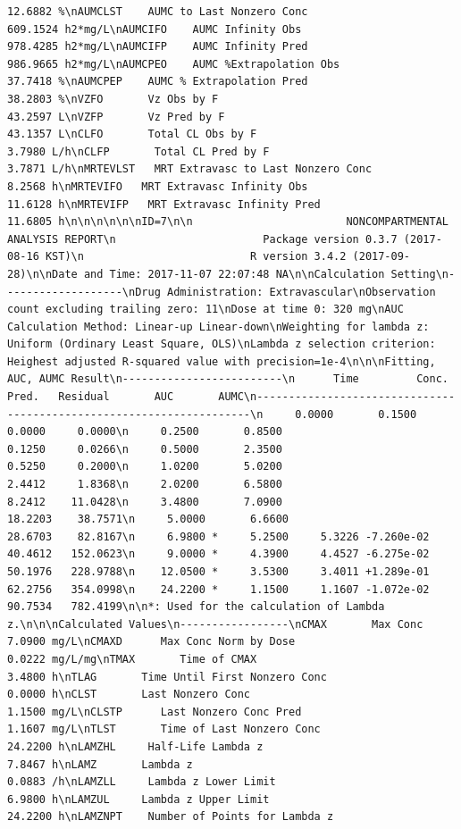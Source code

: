 \documentclass[12pt,]{krantz}
\theoremstyle{definition}
\theoremstyle{definition}
\theoremstyle{definition}
\theoremstyle{remark}
\begin{document}
\begin{verbatim}
12.6882 %\nAUMCLST    AUMC to Last Nonzero Conc                     609.1524 h2*mg/L\nAUMCIFO    AUMC Infinity Obs                             978.4285 h2*mg/L\nAUMCIFP    AUMC Infinity Pred                            986.9665 h2*mg/L\nAUMCPEO    AUMC %Extrapolation Obs                        37.7418 %\nAUMCPEP    AUMC % Extrapolation Pred                      38.2803 %\nVZFO       Vz Obs by F                                    43.2597 L\nVZFP       Vz Pred by F                                   43.1357 L\nCLFO       Total CL Obs by F                               3.7980 L/h\nCLFP       Total CL Pred by F                              3.7871 L/h\nMRTEVLST   MRT Extravasc to Last Nonzero Conc              8.2568 h\nMRTEVIFO   MRT Extravasc Infinity Obs                     11.6128 h\nMRTEVIFP   MRT Extravasc Infinity Pred                    11.6805 h\n\n\n\n\n\nID=7\n\n                        NONCOMPARTMENTAL ANALYSIS REPORT\n                       Package version 0.3.7 (2017-08-16 KST)\n                          R version 3.4.2 (2017-09-28)\n\nDate and Time: 2017-11-07 22:07:48 NA\n\nCalculation Setting\n-------------------\nDrug Administration: Extravascular\nObservation count excluding trailing zero: 11\nDose at time 0: 320 mg\nAUC Calculation Method: Linear-up Linear-down\nWeighting for lambda z: Uniform (Ordinary Least Square, OLS)\nLambda z selection criterion: Heighest adjusted R-squared value with precision=1e-4\n\n\nFitting, AUC, AUMC Result\n-------------------------\n      Time         Conc.      Pred.   Residual       AUC       AUMC\n---------------------------------------------------------------------\n     0.0000       0.1500                           0.0000     0.0000\n     0.2500       0.8500                           0.1250     0.0266\n     0.5000       2.3500                           0.5250     0.2000\n     1.0200       5.0200                           2.4412     1.8368\n     2.0200       6.5800                           8.2412    11.0428\n     3.4800       7.0900                          18.2203    38.7571\n     5.0000       6.6600                          28.6703    82.8167\n     6.9800 *     5.2500     5.3226 -7.260e-02    40.4612   152.0623\n     9.0000 *     4.3900     4.4527 -6.275e-02    50.1976   228.9788\n    12.0500 *     3.5300     3.4011 +1.289e-01    62.2756   354.0998\n    24.2200 *     1.1500     1.1607 -1.072e-02    90.7534   782.4199\n\n*: Used for the calculation of Lambda z.\n\n\nCalculated Values\n-----------------\nCMAX       Max Conc                                        7.0900 mg/L\nCMAXD      Max Conc Norm by Dose                           0.0222 mg/L/mg\nTMAX       Time of CMAX                                    3.4800 h\nTLAG       Time Until First Nonzero Conc                   0.0000 h\nCLST       Last Nonzero Conc                               1.1500 mg/L\nCLSTP      Last Nonzero Conc Pred                          1.1607 mg/L\nTLST       Time of Last Nonzero Conc                      24.2200 h\nLAMZHL     Half-Life Lambda z                              7.8467 h\nLAMZ       Lambda z                                        0.0883 /h\nLAMZLL     Lambda z Lower Limit                            6.9800 h\nLAMZUL     Lambda z Upper Limit                           24.2200 h\nLAMZNPT    Number of Points for Lambda z        
\end{verbatim}
\end{document}
